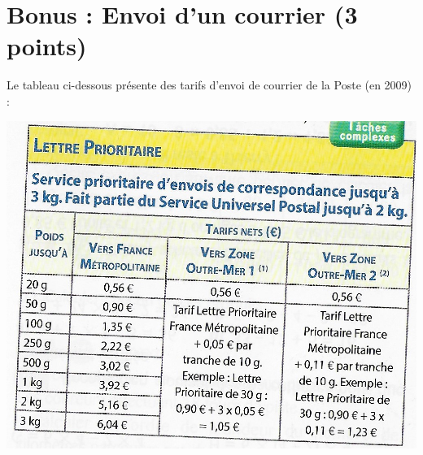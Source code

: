\section{Bonus : Envoi d'un courrier (3 points)}

Le tableau ci-dessous présente des tarifs d'envoi de courrier de la Poste (en 2009) :

\begin{center}
	\includegraphics[scale=1.1]{img/poste}
\end{center}

